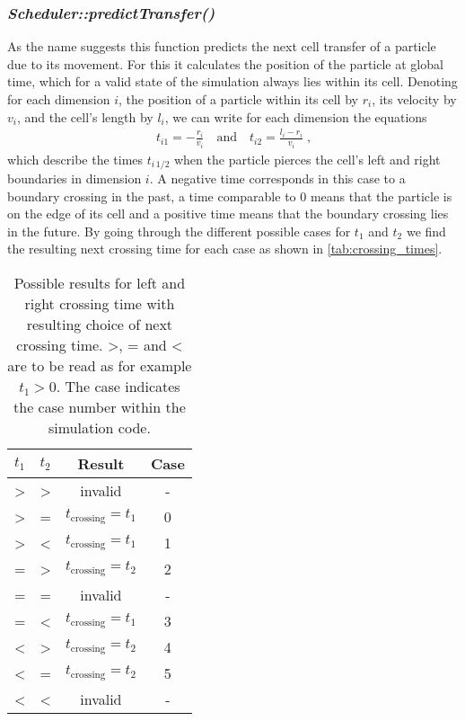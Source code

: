 \subsubsection{\quad \textit{Scheduler::predictTransfer()}}
As the name suggests this function predicts the next cell transfer of a particle due to its movement. For this it calculates the position of the particle at global time, which for a valid state of the simulation always lies within its cell. Denoting for each dimension $i$, the position of a particle within its cell by $r_i$, its velocity by $v_i$, and the cell's length by $l_i$, we can write for each dimension the equations
\begin{align}
t_{i1}=-\frac{r_i}{v_i} \quad \text{and} \quad t_{i2}=\frac{l_i-r_i}{v_i} \; \text{,}
\end{align}
which describe the times $t_{i \, 1/2}$ when the particle pierces the cell's left and right boundaries in dimension $i$. A negative time corresponds in this case to a boundary crossing in the past, a time comparable to 0 means that the particle is on the edge of its cell and a positive time means that the boundary crossing lies in the future. By going through the different possible cases for $t_1$ and $t_2$ we find the resulting next crossing time for each case as shown in \autoref{tab:crossing_times}.
\begin{table}[h]
\centering
\begin{tabular}{c|c||c|c}
$t_1$ & $t_2$ & Result & Case \\ \hline
> & > & invalid & - \\ \hline
> & = & $t_{\text{crossing}} = t_1$ & 0 \\ \hline
> & < & $t_{\text{crossing}} = t_1$ & 1 \\ \hline
= & > & $t_{\text{crossing}} = t_2$ & 2\\ \hline
= & = & invalid & - \\ \hline
= & < & $t_{\text{crossing}} = t_1$ & 3 \\ \hline
< & > & $t_{\text{crossing}} = t_2$ & 4 \\ \hline
< & = & $t_{\text{crossing}} = t_2$ & 5\\ \hline
< & < & invalid & - \\ \hline
\end{tabular}
\caption[Cell boundary crossing conditions]{Possible results for left and right crossing time with resulting choice of next crossing time. >, = and < are to be read as for example $t_1 > 0$. The case indicates the case number within the simulation code.}
\label{tab:crossing_times}
\end{table}

